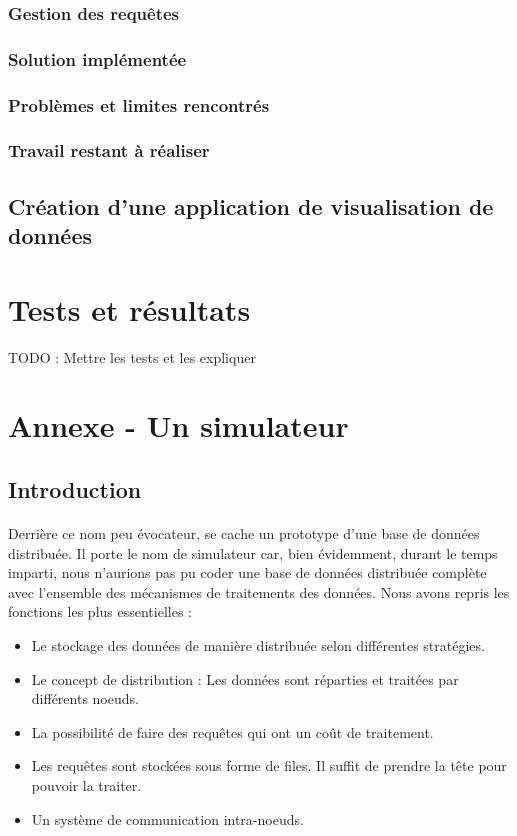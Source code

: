 \documentclass[12pt]{article}
\begin{document}
\subsubsection{Gestion des requêtes}

\subsubsection*{Solution implémentée}
\subsubsection*{Problèmes et limites rencontrés}
\subsubsection*{Travail restant à réaliser}

\subsection{Création d'une application de visualisation de données}

\section{Tests et résultats}

TODO : Mettre les tests et les expliquer

\section{Annexe - Un simulateur}

\subsection{Introduction}

\paragraph{}Derrière ce nom peu évocateur, se cache un prototype d'une base de données distribuée. Il porte le nom de simulateur car, bien évidemment, durant le temps imparti, nous n'aurions pas pu coder une base de données distribuée complète avec l'ensemble des mécanismes de traitements des données. Nous avons repris les fonctions les plus essentielles :

\begin{itemize}
    \item Le stockage des données de manière distribuée selon différentes stratégies.
    \item Le concept de distribution : Les données sont réparties et traitées par différents noeuds.
    \item La possibilité de faire des requêtes qui ont un coût de traitement.
    \item Les requêtes sont stockées sous forme de files. Il suffit de prendre la tête pour pouvoir la traiter.
    \item Un système de communication intra-noeuds.
\end{itemize}
\end{document}

